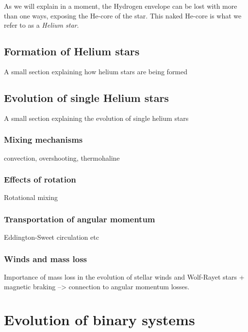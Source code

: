 \documentclass[../../main/thesis_msc.tex]{subfiles}
\begin{document}
    	As we will explain in a moment, the Hydrogen envelope can be lost with more than one ways, exposing the He-core of the star. This naked He-core is what we refer to as a \emph{Helium star}.


			\subsection{Formation of Helium stars}
			
				A small section explaining how helium stars are being formed
				
			
			\subsection{Evolution of single Helium stars}
			
				A small section explaining the evolution of single helium stars    	
				
					\subsubsection{Mixing mechanisms}
					
						convection, overshooting, thermohaline
						
					\subsubsection{Effects of rotation}
					
						Rotational mixing 
						
						
					\subsubsection{Transportation of angular momentum}
					
						Eddington-Sweet circulation etc
						
					\subsubsection{Winds and mass loss}
					
						Importance of mass loss in the evolution of stellar winds and Wolf-Rayet stars + magnetic braking --> connection to angular momentum losses.
						
					
				
	\section{Evolution of binary systems}
	
\end{document}
